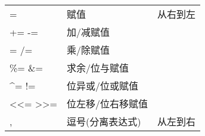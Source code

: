 \documentclass[10pt,a4paper%
tablecaptionabove]{article}
\def\tf{\ttfamily}
\begin{document}
\begin{CJK}{UTF8}{gkai}
\begin{table}[htbp]
\begin{tabular}{l|l|l}
    {\tf =} & 赋值 & 从右到左\\
    {\tf += -=} & 加/减赋值 & \\
    {\tf *= /=} & 乘/除赋值 & \\
    {\tf \%= \&=} & 求余/位与赋值 & \\
    {\tf \^{}= !=} & 位异或/位或赋值 &\\
    {\tf <<= >>=} & 位左移/位右移赋值 & \\\hline
    {\tf ,} & 逗号(分离表达式) & 从左到右\\\hline\hline
  \end{tabular}
\end{table}

\end{CJK}
\end{document}
